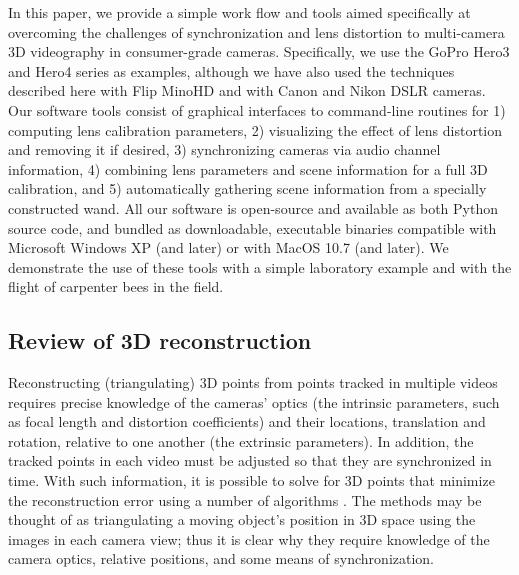 \documentclass[fleqn,10pt]{wlpeerj}
\begin{document}
In this paper, we provide a simple work flow and tools aimed specifically at overcoming the challenges of synchronization and lens distortion to multi-camera 3D videography in consumer-grade cameras. Specifically, we use the GoPro Hero3 and Hero4 series as examples,  although we have also used the techniques described here with Flip MinoHD and with Canon and Nikon DSLR cameras.  Our software tools consist of graphical interfaces to command-line routines for 1) computing lens calibration parameters, 2) visualizing the effect of lens distortion and removing it if desired, 3) synchronizing cameras via audio channel information, 4) combining lens parameters and scene information for a full 3D calibration, and 5) automatically gathering scene information from a specially constructed wand. All our software is open-source and available as both Python source code, and bundled as downloadable, executable binaries compatible with Microsoft Windows XP (and later) or with MacOS 10.7 (and later). We demonstrate the use of these tools with a simple laboratory example and with the flight of carpenter bees in the field.  

\subsection*{Review of 3D reconstruction}

Reconstructing (triangulating) 3D points from points tracked in multiple videos requires precise knowledge of the cameras' optics (the intrinsic parameters, such as focal length and distortion coefficients) and their locations, translation and rotation, relative to one another (the extrinsic parameters).  In addition, the tracked points in each video must be adjusted so that they are synchronized in time.  With such information, it is possible to solve for 3D points that minimize the reconstruction error using a number of algorithms \citep{citations,Hedrick2008, bouguet2004camera,lour09,HartleyZisserman2000}.  The methods may be thought of as triangulating a moving object's position in 3D space using the images in each camera view; thus it is clear why they require knowledge of the camera optics, relative positions, and some means of synchronization.    
\end{document}
